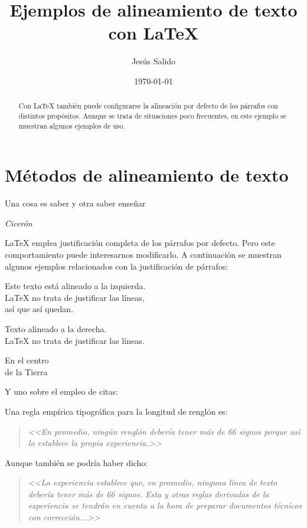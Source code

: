 \documentclass[11pt,a4paper]{report}
\title{Ejemplos de alineamiento de texto con \LaTeX}
\author{Jesús Salido}
\date{\today}
\begin{document}
\maketitle

\begin{abstract}
	Con \LaTeX{} también puede configurarse la alineación por defecto de los párrafos con distintos propósitos. Aunque se trata de situaciones poco frecuentes, en este ejemplo se muestran algunos ejemplos de uso.
\end{abstract}

\chapter{Métodos de alineamiento de texto}
\epigraph{Una cosa es saber y otra saber enseñar}{\textit{Cicerón}}
\LaTeX{} emplea justificación completa de los párrafos por defecto. Pero este comportamiento puede interesarnos modificarlo. A continuación se muestran algunos ejemplos relacionados con la justificación de párrafos:

\begin{flushleft}
	Este texto está alineado a la izquierda. \\
	\LaTeX{} no trata de justificar las líneas, \\ 
	así que así quedan.
\end{flushleft}

\begin{flushright}
	Texto alineado a la derecha. \\
	\LaTeX{} no trata de justificar las líneas.
\end{flushright}

\begin{center}
	En el centro\\
	de la Tierra
\end{center}


\noindent Y uno sobre el empleo de citas:

Una regla empírica tipográfica para la longitud de renglón es:

\begin{quote}
\emph{<<En promedio, ningún renglón debería tener más de 66 signos porque así lo establece la propia experiencia.>>}
\end{quote}


Aunque también se podría haber dicho:


\begin{quote}
\emph{<<La experiencia establece que, en promedio, ninguna línea de texto debería tener más de 66 signos. Esta y otras reglas derivadas de la experiencia se tendrán en cuenta a la hora de preparar documentos técnicos con corrección...>>}
\end{quote}
\end{document}
